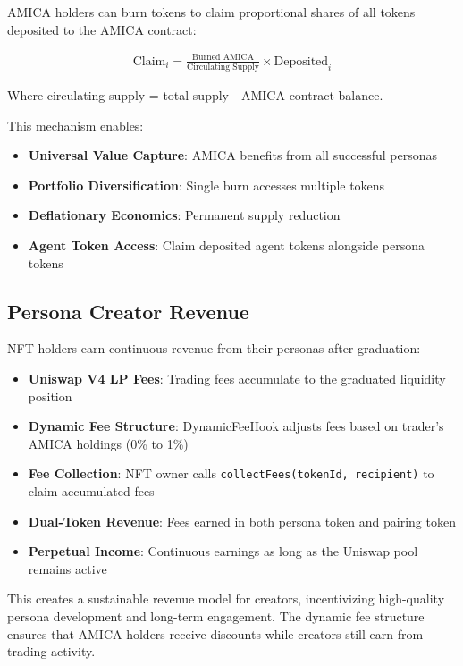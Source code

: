 \documentclass{article}
\begin{document}
AMICA holders can burn tokens to claim proportional shares of all tokens deposited to the AMICA contract:

\begin{align}
\text{Claim}_i = \frac{\text{Burned AMICA}}{\text{Circulating Supply}} \times \text{Deposited}_i
\end{align}

Where circulating supply = total supply - AMICA contract balance.

This mechanism enables:
\begin{itemize}
    \item \textbf{Universal Value Capture}: AMICA benefits from all successful personas
    \item \textbf{Portfolio Diversification}: Single burn accesses multiple tokens
    \item \textbf{Deflationary Economics}: Permanent supply reduction
    \item \textbf{Agent Token Access}: Claim deposited agent tokens alongside persona tokens
\end{itemize}

\subsection{Persona Creator Revenue}

NFT holders earn continuous revenue from their personas after graduation:

\begin{itemize}
    \item \textbf{Uniswap V4 LP Fees}: Trading fees accumulate to the graduated liquidity position
    \item \textbf{Dynamic Fee Structure}: DynamicFeeHook adjusts fees based on trader's AMICA holdings (0\% to 1\%)
    \item \textbf{Fee Collection}: NFT owner calls \texttt{collectFees(tokenId, recipient)} to claim accumulated fees
    \item \textbf{Dual-Token Revenue}: Fees earned in both persona token and pairing token
    \item \textbf{Perpetual Income}: Continuous earnings as long as the Uniswap pool remains active
\end{itemize}

This creates a sustainable revenue model for creators, incentivizing high-quality persona development and long-term engagement. The dynamic fee structure ensures that AMICA holders receive discounts while creators still earn from trading activity.
\end{document}
